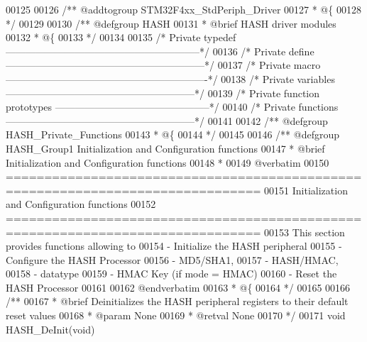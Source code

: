 \begin{DoxyCode}
00125 
00126 \textcolor{comment}{/** @addtogroup STM32F4xx\_StdPeriph\_Driver}
00127 \textcolor{comment}{  * @\{}
00128 \textcolor{comment}{  */}
00129 
00130 \textcolor{comment}{/** @defgroup HASH }
00131 \textcolor{comment}{  * @brief HASH driver modules}
00132 \textcolor{comment}{  * @\{}
00133 \textcolor{comment}{  */}
00134 
00135 \textcolor{comment}{/* Private typedef -----------------------------------------------------------*/}
00136 \textcolor{comment}{/* Private define ------------------------------------------------------------*/}
00137 \textcolor{comment}{/* Private macro -------------------------------------------------------------*/}
00138 \textcolor{comment}{/* Private variables ---------------------------------------------------------*/}
00139 \textcolor{comment}{/* Private function prototypes -----------------------------------------------*/}
00140 \textcolor{comment}{/* Private functions ---------------------------------------------------------*/}
00141 
00142 \textcolor{comment}{/** @defgroup HASH\_Private\_Functions}
00143 \textcolor{comment}{  * @\{}
00144 \textcolor{comment}{  */}
00145 
00146 \textcolor{comment}{/** @defgroup HASH\_Group1 Initialization and Configuration functions}
00147 \textcolor{comment}{ *  @brief    Initialization and Configuration functions }
00148 \textcolor{comment}{ *}
00149 \textcolor{comment}{@verbatim    }
00150 \textcolor{comment}{ ===============================================================================}
00151 \textcolor{comment}{                      Initialization and Configuration functions}
00152 \textcolor{comment}{ ===============================================================================  }
00153 \textcolor{comment}{  This section provides functions allowing to }
00154 \textcolor{comment}{   - Initialize the HASH peripheral}
00155 \textcolor{comment}{   - Configure the HASH Processor }
00156 \textcolor{comment}{      - MD5/SHA1, }
00157 \textcolor{comment}{      - HASH/HMAC, }
00158 \textcolor{comment}{      - datatype }
00159 \textcolor{comment}{      - HMAC Key (if mode = HMAC)}
00160 \textcolor{comment}{   - Reset the HASH Processor }
00161 \textcolor{comment}{   }
00162 \textcolor{comment}{@endverbatim}
00163 \textcolor{comment}{  * @\{}
00164 \textcolor{comment}{  */}
00165 
00166 \textcolor{comment}{/**}
00167 \textcolor{comment}{  * @brief  Deinitializes the HASH peripheral registers to their default reset values}
00168 \textcolor{comment}{  * @param  None}
00169 \textcolor{comment}{  * @retval None}
00170 \textcolor{comment}{  */}
00171 \textcolor{keywordtype}{void} HASH_DeInit(\textcolor{keywordtype}{void})

\end{DoxyCode}
